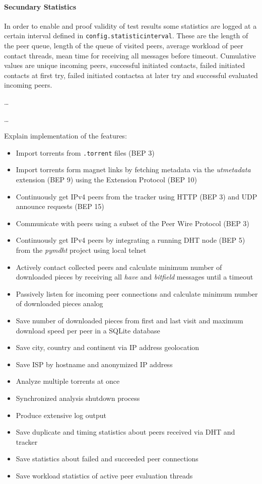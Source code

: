 \documentclass[10pt, a4paper]{scrartcl} %
\renewcommand{\_}{\origunderscore\allowbreak}
\newcommand{\config}[1]{\texttt{config.\allowbreak #1}}
\begin{document}
\paragraph{Secundary Statistics}
In order to enable and proof validity of test results some statistics are logged at a certain interval defined in \config{statistic\_interval}. These are the length of the peer queue, length of the queue of visited peers, average workload of peer contact threads, mean time for receiving all messages before timeout. Cumulative values are unique incoming peers, successful initiated contacts, failed initiated contacts at first try, failed initiated contactsa at later try and successful evaluated incoming peers.

\dots

\hrulefill

\dots

Explain implementation of the features:

\begin{itemize}
\item Import torrents from \texttt{.torrent} files (BEP 3)
\item Import torrents form magnet links by fetching metadata via the \emph{ut\_metadata} extension (BEP 9) using the Extension Protocol (BEP 10)
\item Continuously get IPv4 peers from the tracker using HTTP (BEP 3) and UDP announce requests (BEP 15)
\item Communicate with peers using a subset of the Peer Wire Protocol (BEP 3)
\item Continuously get IPv4 peers by integrating a running DHT node (BEP 5) from the \emph{pymdht} project using local telnet
\item Actively contact collected peers and calculate minimum number of downloaded pieces by receiving all \emph{have} and \emph{bitfield} messages until a timeout
\item Passively listen for incoming peer connections and calculate minimum number of downloaded pieces analog
\item Save number of downloaded pieces from first and last visit and maximum download speed per peer in a SQLite database
\item Save city, country and continent via IP address geolocation
\item Save ISP by hostname and anonymized IP address
\item Analyze multiple torrents at once
\item Synchronized analysis shutdown process
\item Produce extensive log output
\item Save duplicate and timing statistics about peers received via DHT and tracker
\item Save statistics about failed and succeeded peer connections
\item Save workload statistics of active peer evaluation threads
\end{itemize}
\end{document}
